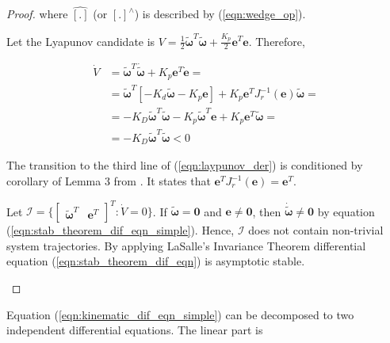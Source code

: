 \begin{proof}
    where $\hat{[.]}$ (or $[.]^{\wedge}$) is described by 
    (\ref{eqn:wedge_op}).

    Let the Lyapunov candidate is $V = \frac{1}{2} 
    \tilde{\boldsymbol{\omega}}^T \tilde{\boldsymbol{\omega}} + 
    \frac{K_p}{2} \mathbf{e}^T \mathbf{e}
    $. Therefore, 

    \begin{equation}
        \begin{aligned}
            \dot{V} & = 
            \tilde{\boldsymbol{\omega}}^T \dot{\tilde{\boldsymbol{\omega}}}
            + K_p 
            \mathbf{e}^T \dot{\mathbf{e}} = \\
            & = \tilde{\boldsymbol{\omega}}^T [
                -K_d \tilde{\boldsymbol{\omega}} - K_p \mathbf{e}
            ] + K_p \mathbf{e}^T J_r^{-1}(\mathbf{e}) \tilde{\boldsymbol{\omega}} =\\
            & = -K_D \tilde{\boldsymbol{\omega}}^T \tilde{\boldsymbol{\omega}} 
            - K_p \tilde{\boldsymbol{\omega}}^T \mathbf{e} 
            + K_p \mathbf{e}^T \tilde{\boldsymbol{\omega}} = \\
            & = -K_D \tilde{\boldsymbol{\omega}}^T \tilde{\boldsymbol{\omega}} 
            < 0 
        \end{aligned}
        \label{eqn:laypunov_der}
    \end{equation}

    The transition to the third line of (\ref{eqn:laypunov_der}) is conditioned 
    by corollary of Lemma 3 from \cite{ANonlinearObserverUsingPose}. It states that 
    $\mathbf{e}^T J_r^{-1}(\mathbf{e}) = \mathbf{e}^T$.

    Let $\mathcal{I} = \{ \begin{bmatrix} \tilde{\boldsymbol{\omega}}^T & 
    \mathbf{e}^T \end{bmatrix}^T : \dot{V} = 0 \}$. If $\tilde{\boldsymbol{\omega}} 
    = \mathbf{0}$ and $\mathbf{e} \neq \mathbf{0}$, then 
    $\dot{\tilde{\boldsymbol{\omega}}} \neq \mathbf{0}$ by equation 
    (\ref{eqn:stab_theorem_dif_eqn_simple}). Hence, $\mathcal{I}$ does not contain 
    non-trivial system trajectories. By applying LaSalle's Invariance Theorem 
    differential equation (\ref{eqn:stab_theorem_dif_eqn}) is asymptotic stable.

    \label{pr:stability_theorem_proof}
\end{proof}

Equation (\ref{eqn:kinematic_dif_eqn_simple}) can be decomposed to two independent 
differential equations. The linear part is

